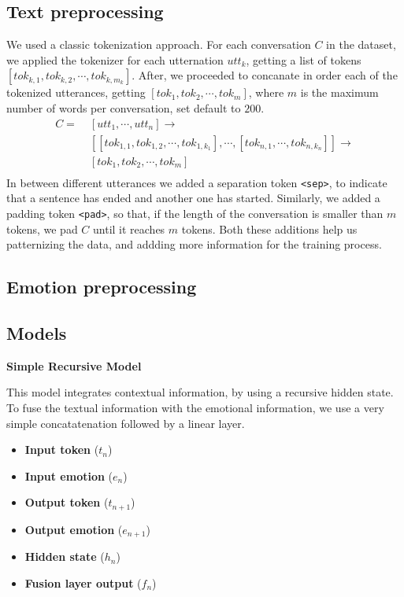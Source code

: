 \documentclass[oneside, a4paper, onecolumn, 11pt]{article}
\begin{document}
\subsection{Text preprocessing}
We used a classic tokenization approach. For each conversation $C$ in the dataset, we applied the tokenizer for each utternation $utt_k$, getting a list of tokens
$[tok_{k,1},tok_{k,2},\cdots, tok_{k,m_k}]$. After, we proceeded to concanate in order each of the tokenized utterances, getting  $[tok_1,tok_2, \cdots, tok_m]$,
where $m$ is the maximum number of words per conversation, set default to $200$.
\begin{align*}
  C = \;&[utt_1, \cdots, utt_n] \to \\
      &[[tok_{1,1},tok_{1,2},\cdots, tok_{1,k_1}], \cdots , [tok_{n,1},\cdots,tok_{n,k_n}]] \to \\
      &[tok_1,tok_2, \cdots, tok_m]  \\
\end{align*}
In between different utterances we added a separation token \texttt{<sep>}, to indicate that a sentence has ended and another one has started. Similarly, we added
a padding token \texttt{<pad>}, so that, if the length of the conversation is smaller than $m$ tokens, we pad $C$ until it reaches $m$ tokens. Both these additions 
help us patternizing the data, and addding more information for the training process.


\subsection{Emotion preprocessing}
\newpage
\subsection{Models}

\begin{center}
  \textbf{Simple Recursive Model}
\end{center}


This model integrates contextual information, by using a recursive hidden state. To fuse the textual information with the emotional information,
we use a very simple concatatenation followed by a linear layer.

\begin{itemize}
  \item \textbf{Input token} ($t_n$)
  \item \textbf{Input emotion }($e_n$)
  \item \textbf{Output token }($t_{n+1}$)
  \item \textbf{Output emotion }($e_{n+1}$)
  \item \textbf{Hidden state } ($h_n$)
  \item \textbf{Fusion layer output }($f_n$)
\end{itemize}
\end{document}
